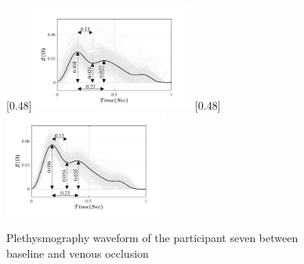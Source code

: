 \begin{figure}[!htbp]
	\centering
	\null\hfill%
	[0.48\textwidth]{\includegraphics[width=0.48\textwidth, trim={0.5cm 0cm 1.5cm 0 cm}, clip]{figure_apa_2a}}%
	\hfill%
	[0.48\textwidth]{\includegraphics[width=0.48\textwidth, trim={0.5cm 0cm 1.5cm 0 cm}, clip]{figure_apa_2b}}%
	\hfill\null%
	\caption{Plethysmography waveform of the participant seven between baseline and venous occlusion}
	\label{fig:iPG_venous}
	
	\vspace{1cm}
	

\end{figure}
